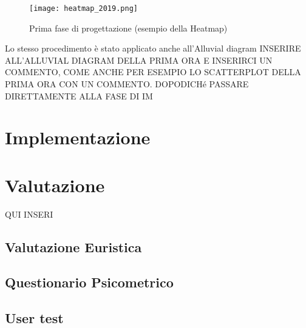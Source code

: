 \documentclass[11pt, a4paper]{report}
\begin{document}
	\begin{figure}[h!]
		\centering
		\texttt{[image: heatmap\_2019.png]}
		\caption{Prima fase di progettazione (esempio della Heatmap)}
		\label{fig:prima_fase_progettazione_esempio_heatmap}
	\end{figure}
	
	Lo stesso procedimento è stato applicato anche all'Alluvial diagram INSERIRE ALL'ALLUVIAL DIAGRAM DELLA PRIMA ORA E INSERIRCI UN COMMENTO, COME ANCHE PER ESEMPIO LO SCATTERPLOT DELLA PRIMA ORA CON UN COMMENTO. DOPODICHé PASSARE DIRETTAMENTE ALLA FASE DI IM
	
		
	\section{Implementazione}
	


	\section{Valutazione}
	
	QUI INSERI


	
	
	\subsection{Valutazione Euristica}
	
	
	
	\subsection{Questionario Psicometrico}
	
	
	\subsection{User test}
	
	
	
	
	
	
	
	
	
	
	
	
	
	
	
\end{document}
